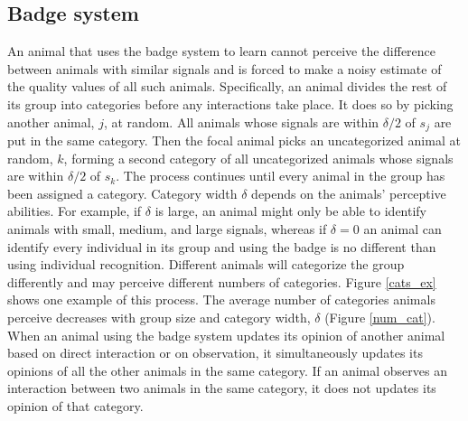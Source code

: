 \subsection{Badge system }
An animal that uses the badge system to learn cannot perceive the difference between animals with similar signals and is forced to make a noisy estimate of the quality values of all such animals.  Specifically, an animal divides the rest of its group into categories before any interactions take place. It does so by picking another animal, $j$, at random. All animals whose signals are within $\delta/2$ of $s_j$ are put in the same category. Then the focal animal picks an uncategorized animal at random, $k$, forming a second category of all uncategorized animals whose signals are within $\delta/2$ of $s_k$. The process continues until every animal in the group has been assigned a category. Category width $\delta$ depends on the animals' perceptive abilities. For example, if $\delta$ is large, an animal might only be able to identify animals with small, medium, and large signals, whereas if $\delta=0$ an animal can identify every individual in its group and using the badge is no different than using individual recognition. Different animals will categorize the group differently and may perceive different numbers of categories. Figure \ref{cats_ex} shows one example of this process. 
The average number of categories  animals perceive decreases with group size and category width, $\delta$ (Figure \ref{num_cat}). When an animal using the badge system updates its opinion of another animal based on direct interaction or on observation, it simultaneously updates its opinions of all the other animals in the same category. If an animal observes an interaction between two animals in the same category, it does not updates its opinion of that category.

